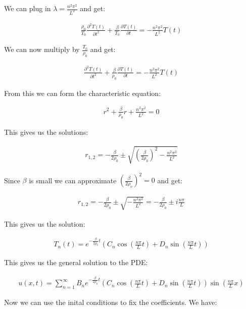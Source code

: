 \documentclass[a4paper]{article}
\begin{document}
We can plug in $\lambda = \frac{n^2\pi^2}{L^2}$ and get:

\begin{align*}
    \frac{\rho_0}{T_0} \frac{\partial^2 T(t)}{\partial t^2} + \frac{\beta}{T_0} \frac{\partial T(t)}{\partial t} = -\frac{n^2\pi^2}{L^2} T(t)
\end{align*}

We can now multiply by $\frac{T_0}{\rho_0}$ and get:

\begin{align*}
    \frac{\partial^2 T(t)}{\partial t^2} + \frac{\beta}{\rho_0} \frac{\partial T(t)}{\partial t} = -\frac{n^2\pi^2}{L^2} T(t)
\end{align*}

From this we can form the characteristic equation:

\begin{align*}
    r^2 + \frac{\beta}{\rho_0} r + \frac{n^2\pi^2}{L^2} = 0
\end{align*}

This gives us the solutions:

\begin{align*}
    r_{1,2} = -\frac{\beta}{2\rho_0} \pm \sqrt{\left(\frac{\beta}{2\rho_0}\right)^2 - \frac{n^2\pi^2}{L^2}}
\end{align*}

Since $\beta$ is small we can approximate $\left(\frac{\beta}{2 \rho_o}\right)^2 = 0$ and get:

\begin{align*}
    r_{1,2} = -\frac{\beta}{2\rho_0} \pm \sqrt{-\frac{n^2\pi^2}{L^2}} = -\frac{\beta}{2\rho_0} \pm i \frac{n\pi}{L}
\end{align*}

This gives us the solution:

\begin{align*}
    T_n(t) = e^{-\frac{\beta}{2\rho_0}t}\left( C_n \cos\left(\frac{n\pi}{L}t\right) + D_n \sin\left(\frac{n\pi}{L}t\right) \right)
\end{align*}

This gives us the general solution to the PDE:

\begin{align*}
    u(x,t) = \sum_{n=1}^{\infty} B_n e^{-\frac{\beta}{2\rho_0}t}\left( C_n \cos\left(\frac{n\pi}{L}t\right) + D_n \sin\left(\frac{n\pi}{L}t\right) \right) \sin\left(\frac{n\pi}{L}x\right)
\end{align*}

Now we can use the inital conditions to fix the coefficients. We have:
\end{document}
